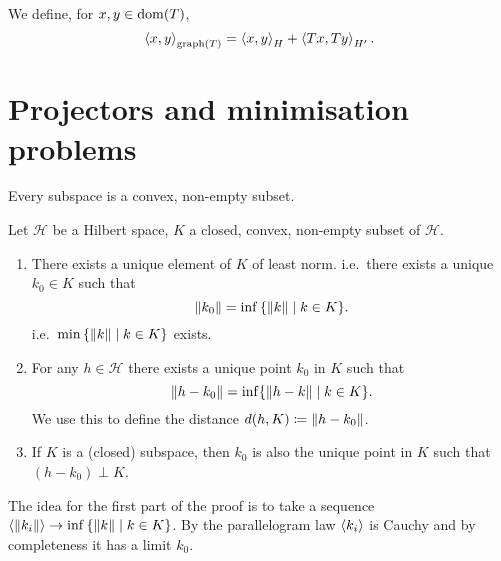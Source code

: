 We define, for $x,y\in \operatorname{dom}(T)$,
\[ \left\langle x,y \right\rangle_{\operatorname{graph}(T)} = \left\langle x,y \right\rangle_H + \left\langle Tx,Ty \right\rangle_{H'}. \]

\section{Projectors and minimisation problems}
Every subspace is a convex, non-empty subset.
\begin{theorem}
Let $\mathcal{H}$ be a Hilbert space, $K$ a closed, convex, non-empty subset of $\mathcal{H}$.
\begin{enumerate}
\item There exists a unique element of $K$ of least norm. i.e.\ there exists a unique $k_0\in K$ such that
\[ \norm{k_0} = \inf\setbuilder{\norm{k}}{k\in K}. \]
i.e.\ $\min\setbuilder{\norm{k}}{k\in K}$ exists.
\item For any $h\in\mathcal{H}$ there exists a unique point $k_0$ in $K$ such that
\[ \lVert h-k_0\rVert = \inf\{\lVert h-k\rVert\;|\; k\in K\}. \]
We use this to define the distance $d(h,K) \coloneqq \lVert h-k_0\rVert$.
\item If $K$ is a (closed) subspace, then $k_0$ is also the unique point in $K$ such that $(h-k_0)\perp K$.
\end{enumerate}
\end{theorem}
The idea for the first part of the proof is to take a sequence $\seq{\norm{k_i}}\to \inf\setbuilder{\norm{k}}{k\in K}$. By the parallelogram law $\left\langle k_i \right\rangle$ is Cauchy and by completeness it has a limit $k_0$.
